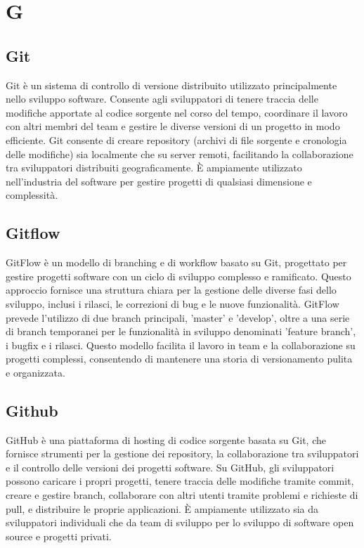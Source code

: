 \section*{G} 
\subsection*{Git} 
Git è un sistema di controllo di versione distribuito utilizzato principalmente nello sviluppo software. Consente agli sviluppatori di tenere traccia delle modifiche apportate al codice sorgente nel corso del tempo, coordinare il lavoro con altri membri del team e gestire le diverse versioni di un progetto in modo efficiente. Git consente di creare repository (archivi di file sorgente e cronologia delle modifiche) sia localmente che su server remoti, facilitando la collaborazione tra sviluppatori distribuiti geograficamente. È ampiamente utilizzato nell'industria del software per gestire progetti di qualsiasi dimensione e complessità.
\subsection*{Gitflow} 
GitFlow è un modello di branching e di workflow basato su Git, progettato per gestire progetti software con un ciclo di sviluppo complesso e ramificato. Questo approccio fornisce una struttura chiara per la gestione delle diverse fasi dello sviluppo, inclusi i rilasci, le correzioni di bug e le nuove funzionalità. GitFlow prevede l'utilizzo di due branch principali, 'master' e 'develop', oltre a una serie di branch temporanei per le funzionalità in sviluppo denominati 'feature branch', i bugfix e i rilasci. Questo modello facilita il lavoro in team e la collaborazione su progetti complessi, consentendo di mantenere una storia di versionamento pulita e organizzata.
\subsection*{Github} 
GitHub è una piattaforma di hosting di codice sorgente basata su Git, che fornisce strumenti per la gestione dei repository, la collaborazione tra sviluppatori e il controllo delle versioni dei progetti software. Su GitHub, gli sviluppatori possono caricare i propri progetti, tenere traccia delle modifiche tramite commit, creare e gestire branch, collaborare con altri utenti tramite problemi e richieste di pull, e distribuire le proprie applicazioni. È ampiamente utilizzato sia da sviluppatori individuali che da team di sviluppo per lo sviluppo di software open source e progetti privati.
